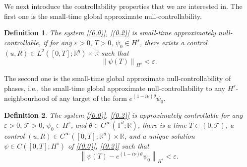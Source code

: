 \documentclass[review]{elsarticle}
\newtheorem{definition}{Definition}[section]
\theoremstyle{dotless}
\def\R {\mathbb{R}}
\numberwithin{equation}{section}
\begin{document}
We next introduce the controllability properties that we are interested in. The first one is the small-time global approximate null-controllability.
\begin{definition}\label{def:control0}
The system \eqref{(0.0)}, \eqref{(0.2)} is small-time approximately null-controllable, if for any $ \varepsilon>0,\, T>0,\,\psi_0 \in H^s$, there exists a control $(u,R) \in L^2([0,T];\R^q)\times\R$ such that
\begin{equation*}
	\left\|\psi(T)\right\|_{H^s}<\varepsilon.
\end{equation*}
\end{definition}
The second one is the small-time global approximate null-controllability of phases, i.e., the small-time global approximate null-controllability to any $H^s$-neighbourhood of any target  of the form $ e^{(1-i\nu) \theta} \psi_0$.
\begin{definition}\label{def:control1}
The system \eqref{(0.0)}, \eqref{(0.2)} is approximately controllable for any $\varepsilon>0,\, \mathcal{T}>0,\, \psi_0 \in H^s$, and $\theta \in C^{\infty}\left(\mathbb{T}^d ; \mathbb{R}\right)$, there is a time $T \in(0, \mathcal{T})$, a control $(u,R) \in C^{\infty}\left([0, T] ; \mathbb{R}^{q}\right)\times\R$, and a unique solution $\psi \in C\left([0, T] ; H^s\right)$ of \eqref{(0.0)}, \eqref{(0.2)} such that
\begin{equation*}
\left\|\psi(T)-e^{(1-i\nu) \theta} \psi_0\right\|_{H^s}<\varepsilon.
\end{equation*}
\end{definition}
\end{document}
